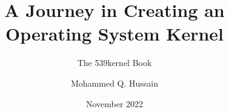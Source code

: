 \documentclass[11pt,a4paper,footinclude=true,headinclude=true,oneside]{scrbook} %
\begin{document}
    \title{A Journey in Creating an Operating System Kernel}
    \subtitle{The 539kernel Book}
    \author{Mohammed Q. Hussain}
    \date{November 2022}
    
    \maketitle
    
    \newpage
    \thispagestyle{plain}
    \mbox{}

	\tableofcontents 
	
    \newpage
    \thispagestyle{plain}
    \mbox{}
    
	
	
	\newpage
    \thispagestyle{plain}
    \mbox{}
    
	
	
	\newpage
    \thispagestyle{plain}
    \mbox{}
    
    
    
    
    
    
    
    
    \newpage
    \thispagestyle{plain}
    \mbox{}
    
    
\end{document}
